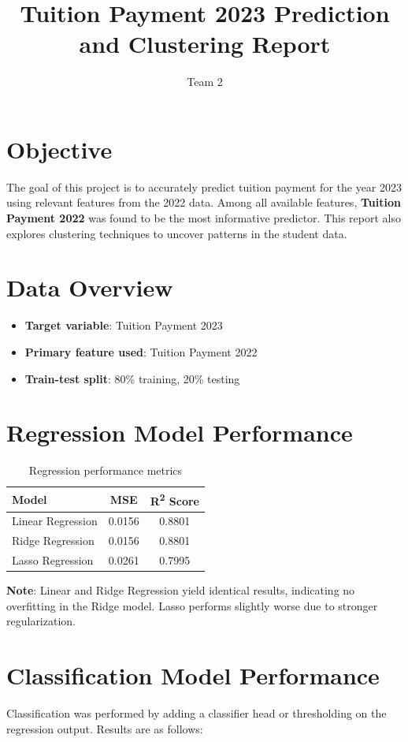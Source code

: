 \documentclass{article}
\title{Tuition Payment 2023 Prediction and Clustering Report}
\author{Team 2}
\date{}
\begin{document}
\maketitle

\section{Objective}
The goal of this project is to accurately predict tuition payment for the year 2023 using relevant features from the 2022 data. Among all available features, \textbf{Tuition Payment 2022} was found to be the most informative predictor. This report also explores clustering techniques to uncover patterns in the student data.

\section{Data Overview}
\begin{itemize}
    \item \textbf{Target variable}: Tuition Payment 2023
    \item \textbf{Primary feature used}: Tuition Payment 2022
    \item \textbf{Train-test split}: 80\% training, 20\% testing
\end{itemize}

\section{Regression Model Performance}
\begin{table}[H]
\centering
\begin{tabular}{lcc}
\toprule
\textbf{Model} & \textbf{MSE} & \textbf{R\textsuperscript{2} Score} \\
\midrule
Linear Regression & 0.0156 & 0.8801 \\
Ridge Regression & 0.0156 & 0.8801 \\
Lasso Regression & 0.0261 & 0.7995 \\
\bottomrule
\end{tabular}
\caption{Regression performance metrics}
\end{table}

\textbf{Note}: Linear and Ridge Regression yield identical results, indicating no overfitting in the Ridge model. Lasso performs slightly worse due to stronger regularization.

\section{Classification Model Performance}
Classification was performed by adding a classifier head or thresholding on the regression output. Results are as follows:
\end{document}
